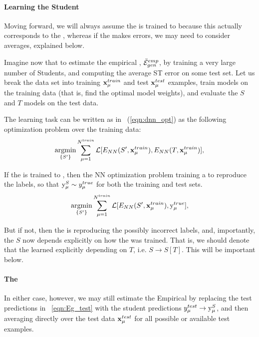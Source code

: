 \paragraph{Learning the Student}
Moving forward, we will always assume the \Teacher is trained to \Interpolation because this
actually corresponds to the \AnnealedApproximation, whereas if the \Teacher makes
errors, we may need to consider \Quenched averages, explained below.

Imagine now that to estimate the empirical \AverageGeneralizationError, $\bar{\mathcal{E}}^{emp}_{gen}$,
by training a very large number of Students, and computing the average ST error on some test set.
Let us break the data set into training $\mathbf{x}_{\mu}^{train}$ and test $\mathbf{x}_{\mu}^{test}$ examples, 
train models on the training data (that is, find the optimal model weights), 
and evaluate the $S$ and $T$ models on the test data.

The \Student learning task can be written as in \EQN~(\ref{eqn:dnn_opt})
as the following optimization problem over the training data:
\begin{align}
\underset{\{S'\}}{\text{argmin}}\sum_{\mu=1}^{N^{train}}\mathcal{L}[E_{NN}(S',\mathbf{x}_{\mu}^{train}),E_{NN}(T,\mathbf{x}_{\mu}^{train})]   ,
\label{eqn:ST-learning-task}
\end{align}

If the \Teacher is trained to \Interpolation, then the NN optimization problem 
training a \Student to reproduce the \GroundTruth labels, so that $\mathrm{y}_{\mu}^{S}\sim y_{\mu}^{true}$
for both the training and test sets.
\begin{align}
\underset{\{S'\}}{\text{argmin}}\sum_{\mu=1}^{N^{train}}\mathcal{L}[E_{NN}(S',\mathbf{x}_{\mu}^{train}),\mathrm{y}_{\mu}^{true}]   ,
\label{eqn:ST-learning-intepolation}
\end{align}

But if not, then the \Student is reproducing the possibly
incorrect \Teacher labels, and, importantly, the \Student $S$ now depends explicitly
on how the \Teacher was trained.  That is, we should denote that the learned
\Student explicitly depending on $T$, i.e. $S\rightarrow S[T]$.
This will be important below.

\paragraph{The \AverageGeneralizationError}
In either case, however, we may still estimate the Empirical \AverageGeneralizationError
by replacing the test predictions in \EQN~\ref{eqn:Eg_test} with the student predictions
$y_{\mu}^{test}\rightarrow \mathrm{y}_{\mu}^{S}$, and then averaging directly over the test data $\mathbf{x}_{\mu}^{test}$
for all possible or available test examples.

